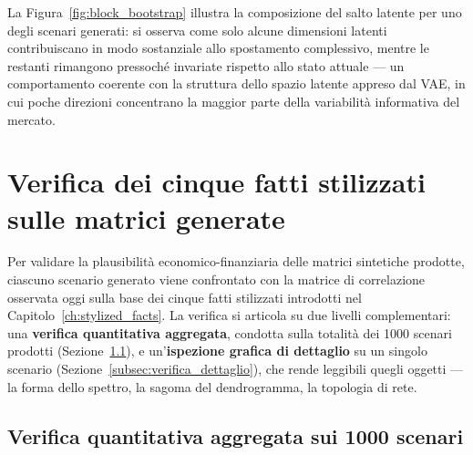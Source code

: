 La Figura~\ref{fig:block_bootstrap} illustra la composizione del salto latente per uno degli scenari generati: si osserva come solo alcune dimensioni latenti contribuiscano in modo sostanziale allo spostamento complessivo, mentre le restanti rimangono pressoché invariate rispetto allo stato attuale --- un comportamento coerente con la struttura dello spazio latente appreso dal VAE, in cui poche direzioni concentrano la maggior parte della variabilità informativa del mercato.

\section{Verifica dei cinque fatti stilizzati sulle matrici generate}
\label{sec:verifica_stylized_facts_generate}

Per validare la plausibilità economico-finanziaria delle matrici sintetiche prodotte, ciascuno scenario generato viene confrontato con la matrice di correlazione osservata oggi sulla base dei cinque fatti stilizzati introdotti nel Capitolo~\ref{ch:stylized_facts}. La verifica si articola su due livelli complementari: una \textbf{verifica quantitativa aggregata}, condotta sulla totalità dei 1000 scenari prodotti (Sezione~\ref{subsec:verifica_aggregata}), e un'\textbf{ispezione grafica di dettaglio} su un singolo scenario (Sezione~\ref{subsec:verifica_dettaglio}), che rende leggibili quegli oggetti --- la forma dello spettro, la sagoma del dendrogramma, la topologia di rete.

\subsection{Verifica quantitativa aggregata sui 1000 scenari}
\label{subsec:verifica_aggregata}

